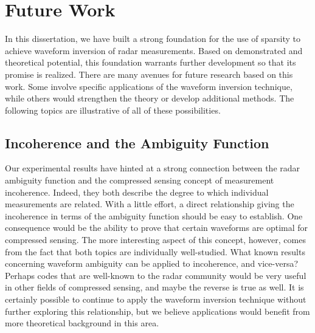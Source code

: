 \section{Future Work}
\label{future_work}
In this dissertation, we have built a strong foundation for the use of sparsity to achieve waveform inversion of radar measurements. Based on demonstrated and theoretical potential, this foundation warrants further development so that its promise is realized. There are many avenues for future research based on this work. Some involve specific applications of the waveform inversion technique, while others would strengthen the theory or develop additional methods. The following topics are illustrative of all of these possibilities.

\subsection{Incoherence and the Ambiguity Function}
Our experimental results have hinted at a strong connection between the radar ambiguity function and the compressed sensing concept of measurement incoherence. Indeed, they both describe the degree to which individual measurements are related. With a little effort, a direct relationship giving the incoherence in terms of the ambiguity function should be easy to establish. One consequence would be the ability to prove that certain waveforms are optimal for compressed sensing. The more interesting aspect of this concept, however, comes from the fact that both topics are individually well-studied. What known results concerning waveform ambiguity can be applied to incoherence, and vice-versa? Perhaps codes that are well-known to the radar community would be very useful in other fields of compressed sensing, and maybe the reverse is true as well. It is certainly possible to continue to apply the waveform inversion technique without further exploring this relationship, but we believe applications would benefit from more theoretical background in this area.

